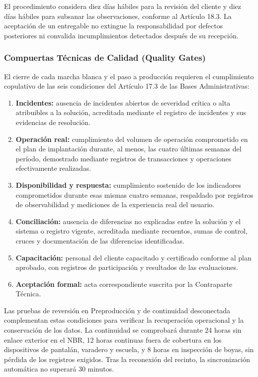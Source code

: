 El procedimiento considera diez días hábiles para la revisión del cliente y diez días hábiles para subsanar las observaciones, conforme al Artículo 18.3. La aceptación de un entregable no extingue la responsabilidad por defectos posteriores ni convalida incumplimientos detectados después de su recepción.

\subsubsection{Compuertas Técnicas de Calidad (Quality Gates)}
El cierre de cada marcha blanca y el paso a producción requieren el cumplimiento copulativo de las seis condiciones del Artículo 17.3 de las Bases Administrativas:
\begin{enumerate}
    \item \textbf{Incidentes:} ausencia de incidentes abiertos de severidad crítica o alta atribuibles a la solución, acreditada mediante el registro de incidentes y sus evidencias de resolución.

    \item \textbf{Operación real:} cumplimiento del volumen de operación comprometido en el plan de implantación durante, al menos, las cuatro últimas semanas del período, demostrado mediante registros de transacciones y operaciones efectivamente realizadas.

    \item \textbf{Disponibilidad y respuesta:} cumplimiento sostenido de los indicadores comprometidos durante esas mismas cuatro semanas, respaldado por registros de observabilidad y mediciones de la experiencia real del usuario.

    \item \textbf{Conciliación:} ausencia de diferencias no explicadas entre la solución y el sistema o registro vigente, acreditada mediante recuentos, sumas de control, cruces y documentación de las diferencias identificadas.

    \item \textbf{Capacitación:} personal del cliente capacitado y certificado conforme al plan aprobado, con registros de participación y resultados de las evaluaciones.

    \item \textbf{Aceptación formal:} acta correspondiente suscrita por la Contraparte Técnica.
\end{enumerate}

Las pruebas de reversión en Preproducción y de continuidad desconectada complementan estas condiciones para verificar la recuperación operacional y la conservación de los datos. La continuidad se comprobará durante 24 horas sin enlace exterior en el NBR, 12 horas continuas fuera de cobertura en los dispositivos de pantalán, varadero y escuela, y 8 horas en inspección de boyas, sin pérdida de los registros exigidos. Tras la reconexión del recinto, la sincronización automática no superará 30 minutos.

